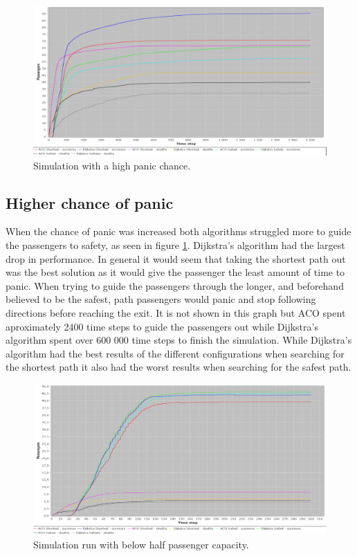 \begin{figure} [h]
\centering
\hspace*{-1.0in}
\includegraphics[scale=0.35]{images/Graph-using-200-rounds-140-passangers-and-high-panic.png}
\caption{Simulation with a high panic chance.}
\label{fig:celebHPanic}
\end{figure}

\subsection{Higher chance of panic}

When the chance of panic was increased both algorithms struggled more to guide the passengers to safety, as seen in figure \ref{fig:celebHPanic}. Dijkstra's algorithm had the largest drop in performance. In general it would seem that taking the shortest path out was the best solution as it would give the passenger the least amount of time to panic. When trying to guide the passengers through the longer, and beforehand believed to be the safest, path passengers would panic and stop following directions before reaching the exit. It is not shown in this graph but ACO spent aproximately 2400 time steps to guide the passengers out while Dijkstra's algorithm spent over 600 000 time steps to finish the simulation. While Dijkstra's algorithm had the best results of the different configurations when searching for the shortest path it also had the worst results when searching for the safest path.

\begin{figure} [h]
\centering
\hspace*{-1.0in}
\includegraphics[scale=0.35]{images/Graph-using-200-rounds-50-passangers.png}
\caption{Simulation run with below half passenger capacity.}
\label{fig:celeb50}
\end{figure}

